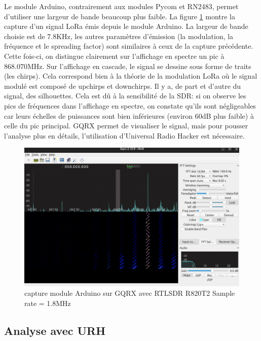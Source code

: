 Le module Arduino, contrairement aux modules Pycom et RN2483, permet d'utiliser une largeur de bande beaucoup plus faible. La figure \ref{term302} montre la capture d'un signal \ac{LoRa} émis depuis le module Arduino. La largeur de bande choisie est de 7.8KHz, les autres paramètres d'émission (la modulation, la fréquence et le spreading factor) sont similaires à ceux de la capture précédente. Cette fois-ci, on distingue clairement sur l'affichage en spectre un pic à 868.070MHz. Sur l'affichage en cascade, le signal se dessine sous forme de traits (les chirps). Cela correspond bien à la théorie de la modulation \ac{LoRa} où le signal modulé est composé de upchirps et downchirps. Il y a, de part et d'autre du signal, des silhouettes. Cela est dû à la sensibilité de la \ac{SDR}: si on observe les pics de fréquences dans l'affichage en spectre, on constate qu'ils sont négligeables car leurs échelles de puissances sont bien inférieures (environ 60dB plus faible) à celle du pic principal. GQRX permet de visualiser le signal, mais pour pousser l'analyse plus en détails, l'utilisation d'Universal Radio Hacker est nécessaire.

\begin{figure}[h]
\centering

\includegraphics[scale=0.17]{images/gqrx5.png}
\caption{capture module Arduino sur GQRX avec RTLSDR R820T2 Sample rate = 1.8MHz}\label{term302}
\end{figure}


\subsection{Analyse avec URH}\label{urh}

